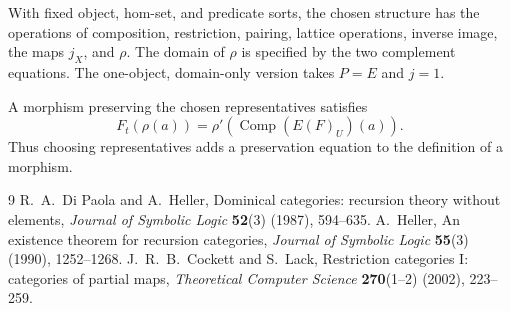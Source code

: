 \documentclass[11pt]{article}
\theoremstyle{definition}
\newcommand{\Comp}{\operatorname{Comp}}
\begin{document}
With fixed object, hom-set, and predicate sorts, the chosen structure has
the operations of composition, restriction, pairing, lattice operations,
inverse image, the maps $j_X$, and $\rho$. The domain of $\rho$ is specified
by the two complement equations. The one-object, domain-only version
takes $P=E$ and $j=1$.

A morphism preserving the chosen representatives satisfies
\[
 F_t(\rho(a))=\rho'(\Comp(E(F)_U)(a)).
\]
Thus choosing representatives adds a preservation equation to the
definition of a morphism.

\begin{thebibliography}{9}
 R.~A.~Di Paola and A.~Heller,
Dominical categories: recursion theory without elements,
\emph{Journal of Symbolic Logic} \textbf{52}(3) (1987), 594--635.
 A.~Heller,
An existence theorem for recursion categories,
\emph{Journal of Symbolic Logic} \textbf{55}(3) (1990), 1252--1268.
 J.~R.~B.~Cockett and S.~Lack,
Restriction categories I: categories of partial maps,
\emph{Theoretical Computer Science} \textbf{270}(1--2) (2002), 223--259.
\end{thebibliography}
\end{document}
